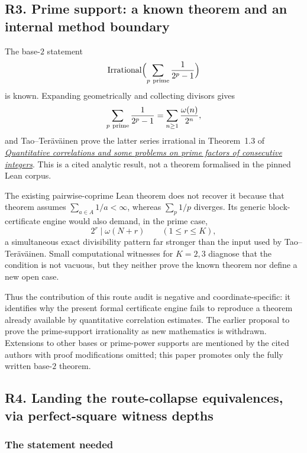\documentclass[11pt]{article}
\theoremstyle{plain}
\theoremstyle{definition}
\theoremstyle{remark}
\let\origmathrm\mathrm
\renewcommand{\mathrm}[1]{\ifmmode\origmathrm{#1}\else\textrm{#1}\fi}%
\begin{document}
\subsection{R3. Prime support: a known theorem and an internal method boundary}
\label{sec:invent-R3}

The base-$2$ statement
\[
\mathrm{Irrational}\Bigl(\sum_{p\ {\rm prime}}\frac1{2^p-1}\Bigr)
\]
is known.  Expanding geometrically and collecting divisors gives
\[
 \sum_{p\ {\rm prime}}\frac1{2^p-1}
 =\sum_{n\ge1}\frac{\omega(n)}{2^n},
\]
and Tao--Ter\"av\"ainen prove the latter series irrational in Theorem~1.3
of
\href{https://arxiv.org/abs/2512.01739}{\emph{Quantitative correlations and
some problems on prime factors of consecutive integers}}.  This is a cited
analytic result, not a theorem formalised in the pinned Lean corpus.

The existing pairwise-coprime Lean theorem does not recover it because that
theorem assumes $\sum_{a\in A}1/a<\infty$, whereas $\sum_p1/p$ diverges.  Its
generic block-certificate engine would also demand, in the prime case,
\[
  2^r\mid\omega(N+r)\qquad(1\le r\le K),
\]
a simultaneous exact divisibility pattern far stronger than the input used
by Tao--Ter\"av\"ainen.  Small computational witnesses for $K=2,3$ diagnose
that the condition is not vacuous, but they neither prove the known theorem
nor define a new open case.

Thus the contribution of this route audit is negative and
coordinate-specific: it identifies why the present formal certificate
engine fails to reproduce a theorem already available by quantitative
correlation estimates.  The earlier proposal to prove the prime-support
irrationality as new mathematics is withdrawn.  Extensions to other bases
or prime-power supports are mentioned by the cited authors with proof
modifications omitted; this paper promotes only the fully written base-$2$
theorem.

\subsection{R4. Landing the route-collapse equivalences, via perfect-square witness depths}
\label{sec:invent-R4}

\subsubsection*{The statement needed}
\end{document}
